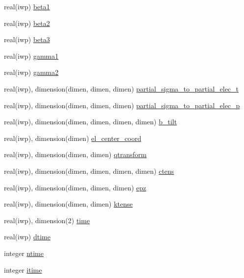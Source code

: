 \begin{DoxyCompactItemize}
real(iwp) \hyperlink{classmaterial__behavior_a99816d6be4ed7244881e685956b7ac06}{beta1}
\item 
real(iwp) \hyperlink{classmaterial__behavior_a91b0b1309a8dfde964d4e497a0d1dcfe}{beta2}
\item 
real(iwp) \hyperlink{classmaterial__behavior_a5c660e2829ac287aeb8d6dd0614da6c1}{beta3}
\item 
real(iwp) \hyperlink{classmaterial__behavior_a43433da9364d24eb86457ce7d5117774}{gamma1}
\item 
real(iwp) \hyperlink{classmaterial__behavior_af9b472629aed862a5eb7ecd36d27a236}{gamma2}
\item 
real(iwp), dimension(dimen, dimen, dimen) \hyperlink{classmaterial__behavior_a7594fd35fa481baa3f66778c4bcc7e3e}{partial\+\_\+sigma\+\_\+to\+\_\+partial\+\_\+elec\+\_\+t}
\item 
real(iwp), dimension(dimen, dimen, dimen) \hyperlink{classmaterial__behavior_a50600c5b8a42a94a1fcf054767620811}{partial\+\_\+sigma\+\_\+to\+\_\+partial\+\_\+elec\+\_\+p}
\item 
real(iwp), dimension(dimen, dimen, dimen, dimen) \hyperlink{classmaterial__behavior_a09bea0d09d129357d5ddd0c3173b5810}{b\+\_\+tilt}
\item 
real(iwp), dimension(dimen) \hyperlink{classmaterial__behavior_a1deebdb156ef27ce0d628eeadc3ea304}{el\+\_\+center\+\_\+coord}
\item 
real(iwp), dimension(dimen, dimen) \hyperlink{classmaterial__behavior_af2aa779e399f21ed79a6c1d2beea23b2}{qtransform}
\item 
real(iwp), dimension(dimen, dimen, dimen, dimen) \hyperlink{classmaterial__behavior_a2d91ec36eec7e8c7c5f24cca84e5a214}{ctens}
\item 
real(iwp), dimension(dimen, dimen, dimen) \hyperlink{classmaterial__behavior_a7f7127af0d37db9dbe5fefca8a895e0f}{epz}
\item 
real(iwp), dimension(dimen, dimen) \hyperlink{classmaterial__behavior_ad71dfe377781d970157d3ff0d60053b3}{ktense}
\item 
real(iwp), dimension(2) \hyperlink{classmaterial__behavior_a4a0c3fd6ab8dc8bc3b46d051187e0fde}{time}
\item 
real(iwp) \hyperlink{classmaterial__behavior_af87866e16be751fbdc71dbf8043fd325}{dtime}
\item 
integer \hyperlink{classmaterial__behavior_a465c3fa1041a65365ebd4e25a80906ba}{ntime}
\item 
integer \hyperlink{classmaterial__behavior_ad096e0a9ad0e078537fd2436057d862a}{itime}

\end{DoxyCompactItemize}
